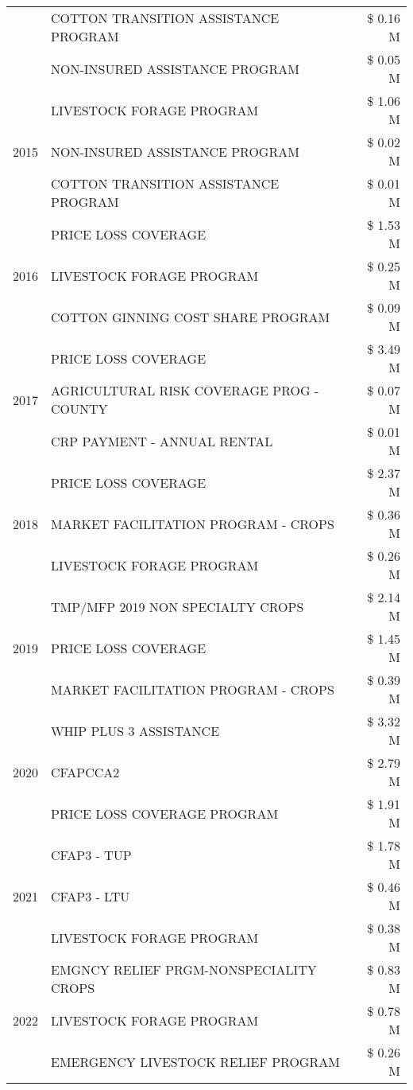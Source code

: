 \begin{tabular}{llr}
 & COTTON TRANSITION ASSISTANCE PROGRAM & \$ 0.16 M \\
 & NON-INSURED ASSISTANCE PROGRAM & \$ 0.05 M \\
\cline{1-3}
\multirow[t]{3}{*}{2015} & LIVESTOCK FORAGE PROGRAM & \$ 1.06 M \\
 & NON-INSURED ASSISTANCE PROGRAM & \$ 0.02 M \\
 & COTTON TRANSITION ASSISTANCE PROGRAM & \$ 0.01 M \\
\cline{1-3}
\multirow[t]{3}{*}{2016} & PRICE LOSS COVERAGE & \$ 1.53 M \\
 & LIVESTOCK FORAGE PROGRAM & \$ 0.25 M \\
 & COTTON GINNING COST SHARE PROGRAM & \$ 0.09 M \\
\cline{1-3}
\multirow[t]{3}{*}{2017} & PRICE LOSS COVERAGE & \$ 3.49 M \\
 & AGRICULTURAL RISK COVERAGE PROG - COUNTY & \$ 0.07 M \\
 & CRP PAYMENT - ANNUAL RENTAL & \$ 0.01 M \\
\cline{1-3}
\multirow[t]{3}{*}{2018} & PRICE LOSS COVERAGE & \$ 2.37 M \\
 & MARKET FACILITATION PROGRAM - CROPS & \$ 0.36 M \\
 & LIVESTOCK FORAGE PROGRAM & \$ 0.26 M \\
\cline{1-3}
\multirow[t]{3}{*}{2019} & TMP/MFP 2019 NON SPECIALTY CROPS & \$ 2.14 M \\
 & PRICE LOSS COVERAGE & \$ 1.45 M \\
 & MARKET FACILITATION PROGRAM - CROPS & \$ 0.39 M \\
\cline{1-3}
\multirow[t]{3}{*}{2020} & WHIP PLUS 3 ASSISTANCE & \$ 3.32 M \\
 & CFAPCCA2 & \$ 2.79 M \\
 & PRICE LOSS COVERAGE PROGRAM & \$ 1.91 M \\
\cline{1-3}
\multirow[t]{3}{*}{2021} & CFAP3 - TUP & \$ 1.78 M \\
 & CFAP3 - LTU & \$ 0.46 M \\
 & LIVESTOCK FORAGE PROGRAM & \$ 0.38 M \\
\cline{1-3}
\multirow[t]{3}{*}{2022} & EMGNCY RELIEF PRGM-NONSPECIALITY CROPS & \$ 0.83 M \\
 & LIVESTOCK FORAGE PROGRAM & \$ 0.78 M \\
 & EMERGENCY LIVESTOCK RELIEF PROGRAM & \$ 0.26 M \\
\cline{1-3}
\bottomrule
\end{tabular}

